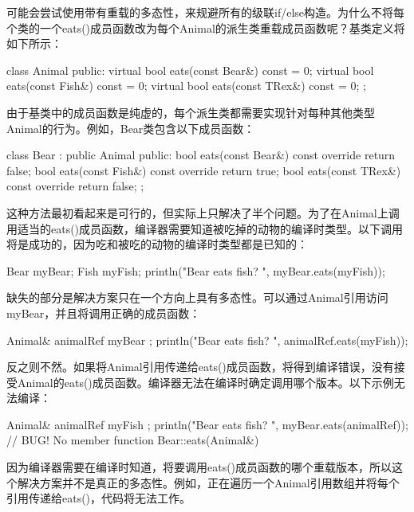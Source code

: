 
可能会尝试使用带有重载的多态性，来规避所有的级联if/else构造。为什么不将每个类的一个eats()成员函数改为每个Animal的派生类重载成员函数呢？基类定义将如下所示：

\begin{cpp}
class Animal
{
    public:
        virtual bool eats(const Bear&) const = 0;
        virtual bool eats(const Fish&) const = 0;
        virtual bool eats(const TRex&) const = 0;
};
\end{cpp}

由于基类中的成员函数是纯虚的，每个派生类都需要实现针对每种其他类型Animal的行为。例如，Bear类包含以下成员函数：

\begin{cpp}
class Bear : public Animal
{
    public:
        bool eats(const Bear&) const override { return false; }
        bool eats(const Fish&) const override { return true; }
        bool eats(const TRex&) const override { return false; }
};
\end{cpp}

这种方法最初看起来是可行的，但实际上只解决了半个问题。为了在Animal上调用适当的eats()成员函数，编译器需要知道被吃掉的动物的编译时类型。以下调用将是成功的，因为吃和被吃的动物的编译时类型都是已知的：

\begin{cpp}
Bear myBear;
Fish myFish;
println("Bear eats fish? {}", myBear.eats(myFish));
\end{cpp}

缺失的部分是解决方案只在一个方向上具有多态性。可以通过Animal引用访问myBear，并且将调用正确的成员函数：

\begin{cpp}
Animal& animalRef { myBear };
println("Bear eats fish? {}", animalRef.eats(myFish));
\end{cpp}

反之则不然。如果将Animal引用传递给eats()成员函数，将得到编译错误，没有接受Animal的eats()成员函数。编译器无法在编译时确定调用哪个版本。以下示例无法编译：

\begin{cpp}
Animal& animalRef { myFish };
println("Bear eats fish? {}",
    myBear.eats(animalRef)); // BUG! No member function Bear::eats(Animal&)
\end{cpp}

因为编译器需要在编译时知道，将要调用eats()成员函数的哪个重载版本，所以这个解决方案并不是真正的多态性。例如，正在遍历一个Animal引用数组并将每个引用传递给eats()，代码将无法工作。

